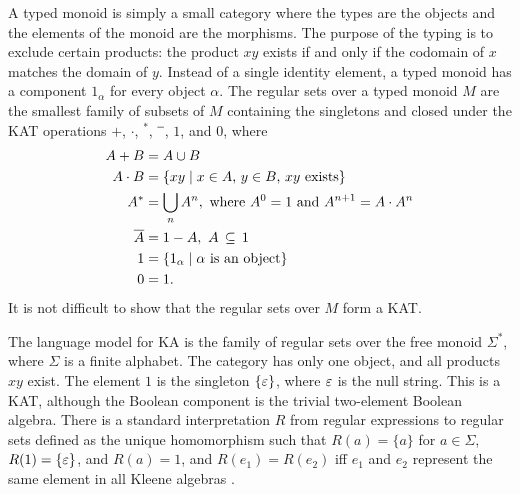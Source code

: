 \documentclass{article}
\renewcommand\star{^*}
\begin{document}
A typed monoid is simply a small category where the types are the objects and the elements of the monoid are the morphisms. The purpose of the typing is to exclude certain products: the product $xy$ exists if and only if the codomain of $x$ matches the domain of $y$. Instead of a single identity element, a typed monoid has a component $1_\alpha$ for every object $\alpha$. The regular sets over a typed monoid $M$ are the smallest family of subsets of $M$ containing the singletons and closed under the KAT operations $+$, $\cdot$, $\star$, $\barnone$, $1$, and $0$, where
\begin{align*}
A+B &= A\cup B\\
A\cdot B &= \set{xy}{\text{$x\in A$, $y\in B$, $xy$ exists}}\\
A\star &= \bigcup_n A^n,\ \text{where $A^0=1$ and $A^{n+1}=A\cdot A^n$}\\
\bar A &= 1 - A,\ A\subs 1\\
1 &= \set{1_\alpha}{\text{$\alpha$ is an object}}\\
0 &= 1.
\end{align*}
It is not difficult to show that the regular sets over $M$ form a KAT.

The language model for KA is the family of regular sets over the free monoid $\Sigma\star$, where $\Sigma$ is a finite alphabet. The category has only one object, and all products $xy$ exist. The element $1$ is the singleton $\{\varepsilon\}$, where $\varepsilon$ is the null string. This is a KAT, although the Boolean component is the trivial two-element Boolean algebra. There is a standard interpretation $R$ from regular expressions to regular sets defined as the unique homomorphism such that $R(a)=\{a\}$ for $a\in\Sigma$, $R(1)=\{\varepsilon\}$, and $R(a)=1$, and $R(e_1)=R(e_2)$ iff $e_1$ and $e_2$ represent the same element in all Kleene algebras \cite{K94b}.
\end{document}
